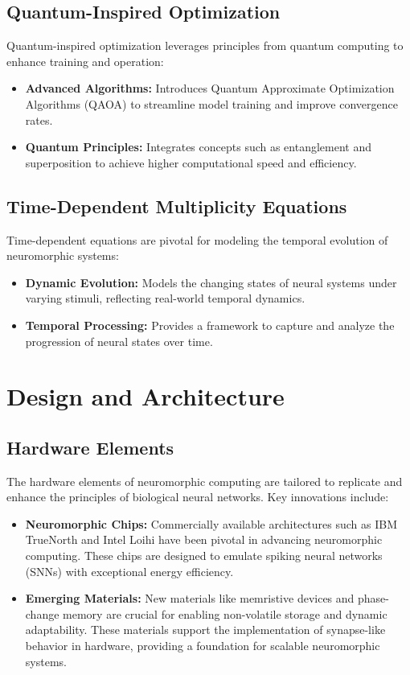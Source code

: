 \documentclass{article}
\theoremstyle{plain}
\begin{document}
\subsection{Quantum-Inspired Optimization}
Quantum-inspired optimization leverages principles from quantum computing to enhance training and operation:
\begin{itemize}
    \item \textbf{Advanced Algorithms:} Introduces Quantum Approximate Optimization Algorithms (QAOA) to streamline model training and improve convergence rates.
    \item \textbf{Quantum Principles:} Integrates concepts such as entanglement and superposition to achieve higher computational speed and efficiency.
\end{itemize}

\subsection{Time-Dependent Multiplicity Equations}
Time-dependent equations are pivotal for modeling the temporal evolution of neuromorphic systems:
\begin{itemize}
    \item \textbf{Dynamic Evolution:} Models the changing states of neural systems under varying stimuli, reflecting real-world temporal dynamics.
    \item \textbf{Temporal Processing:} Provides a framework to capture and analyze the progression of neural states over time.
\end{itemize}


\section{Design and Architecture}

\subsection{Hardware Elements}
The hardware elements of neuromorphic computing are tailored to replicate and enhance the principles of biological neural networks. Key innovations include:
\begin{itemize}
    \item \textbf{Neuromorphic Chips:} Commercially available architectures such as IBM TrueNorth and Intel Loihi have been pivotal in advancing neuromorphic computing. These chips are designed to emulate spiking neural networks (SNNs) with exceptional energy efficiency.
    \item \textbf{Emerging Materials:} New materials like memristive devices and phase-change memory are crucial for enabling non-volatile storage and dynamic adaptability. These materials support the implementation of synapse-like behavior in hardware, providing a foundation for scalable neuromorphic systems.
\end{itemize}
\end{document}
